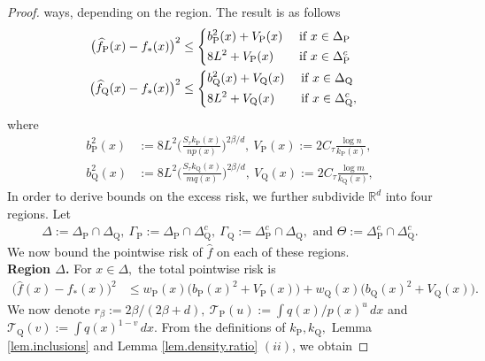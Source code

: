 \documentclass[10pt,a4paper]{amsart}
\renewcommand{\P}{\operatorname{P}}
\newcommand{\Q}{\operatorname{Q}}
\newcommand{\RR}{\mathbb{R}}
\newcommand{\mT}{\mathcal{T}}
\newcommand{\wh}{\widehat}
\begin{document}
\begin{proof}
    ways, depending on the region. The result is as follows
    \begin{align}
        \label{eq.first.bv}
        \begin{split}
        \big(\wh f_{\P}(x) - f_*(x)\big)^2 &\leq \begin{dcases}
            b^2_{\P}(x) + V_{\P}(x) & \text{ if } x \in \Delta_{\P}\\
            8L^2 + V_{\P}(x) &\text{ if } x \in \Delta_{\P}^c
        \end{dcases}\\
        \big(\wh f_{\Q}(x) - f_*(x)\big)^2 &\leq \begin{dcases}
            b^2_{\Q}(x) + V_{\Q}(x) & \text{ if } x \in \Delta_{\Q}\\
            8L^2 + V_{\Q}(x) &\text{ if } x \in \Delta_{\Q}^c,
        \end{dcases}
        \end{split}
    \end{align}
    where
    \begin{align*}
        b_{\P}^2(x) &:= 8L^2\bigg(\frac{S_\tau k_{\P}(x)}{np(x)}\bigg)^{2\beta/d}, \ V_{\P}(x) := 2C_\tau \frac{\log n}{k_{\P}(x)},\\
        b_{\Q}^2(x) &:= 8L^2\bigg(\frac{S_\tau k_{\Q}(x)}{mq(x)}\bigg)^{2\beta/d}, \ V_{\Q}(x) := 2C_\tau \frac{\log m}{k_{\Q}(x)},
    \end{align*}
    In order to derive bounds on the excess risk, we further subdivide $\RR^d$ into four regions. Let 
    \begin{align*}
        \Delta := \Delta_{\P}\cap \Delta_{\Q}, \ \Gamma_{\P} := \Delta_{\P}\cap \Delta_{\Q}^c,\ \Gamma_{\Q} := \Delta_{\P}^c\cap \Delta_{\Q},\text{ and } \Theta := \Delta_{\P}^c\cap \Delta_{\Q}^c.
    \end{align*}
    We now bound the pointwise risk of $\wh f$ on each of these regions.\\
    \noindent\textbf{Region $\Delta$.} For $x \in \Delta,$ the total pointwise risk is
    \begin{align}
        \label{eq.pointwise.loss.bulk}
        \big(\wh f(x) - f_*(x)\big)^2 &\leq w_{\P}(x)\big(b_{\P}(x)
        ^2 + V_{\P}(x)\big) + w_{\Q}(x)\big(b_{\Q}(x)
        ^2 + V_{\Q}(x)\big).
    \end{align}
    We now denote $r_\beta := 2\beta/(2\beta + d), \ \mT_{\P}(u) := \int q(x)/p(x)^{u}\, dx$ and $\mT_{\Q}(v) := \int q(x)^{1 -v}\, dx.$ From the definitions of $k_{\P}, k_{\Q},$ Lemma \ref{lem.inclusions} and Lemma \ref{lem.density.ratio} $(ii)$, we obtain

\end{proof}
\end{document}
